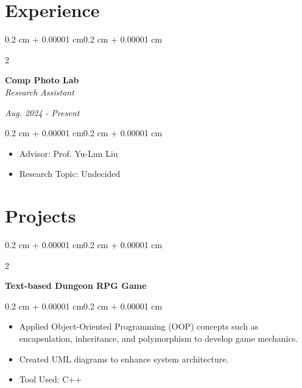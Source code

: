 \documentclass[10pt, letterpaper]{article}
\newenvironment{highlights}{
    \begin{itemize}[
        topsep=0.10 cm,
        parsep=0.10 cm,
        partopsep=0pt,
        itemsep=0pt,
        leftmargin=0.4 cm + 10pt
    ]
}{
    \end{itemize}
}
\newenvironment{onecolentry}{
    \begin{adjustwidth}{0.2 cm + 0.00001 cm}{0.2 cm + 0.00001 cm}
}{
    \end{adjustwidth}
}
\newenvironment{twocolentry}[2][]{
    \onecolentry
    \def\secondColumn{#2}
    \setcolumnwidth{\fill, 4.5 cm}
    \begin{paracol}{2}
}{
    \switchcolumn \raggedleft \secondColumn
    \end{paracol}
    \endonecolentry
}
\let\hrefWithoutArrow\href
\renewcommand{\href}[2]{\hrefWithoutArrow{#1}{\ifthenelse{\equal{#2}{}}{ }{#2 }\raisebox{.15ex}{\footnotesize \faExternalLink*}}}
\begin{document}
    \section{Experience}
        \begin{twocolentry}{
        \textit{Aug. 2024 - Present}}
            \textbf{Comp Photo Lab} \\
            \textit{Research Assistant}
        \end{twocolentry}
        \vspace{0.10 cm}
        \begin{onecolentry}
            \begin{highlights}
                \item Advisor: Prof. Yu-Lun Liu
                \item Research Topic: Undecided
            \end{highlights}
        \end{onecolentry}

    \section{Projects}

        \begin{twocolentry}{
        \textit{\href{https://github.com/ChuEating1005/DS-OOP}{Link}}}
            \textbf{Text-based Dungeon RPG Game}
        \end{twocolentry}
        \vspace{0.10 cm}
        \begin{onecolentry}
            \begin{highlights}
                \item Applied Object-Oriented Programming (OOP) concepts such as encapsulation, inheritance, and polymorphism to develop game mechanics.
                \item Created UML diagrams to enhance system architecture.
                \item Tool Used: C++
            \end{highlights}
        \end{onecolentry}
        
\end{document}
